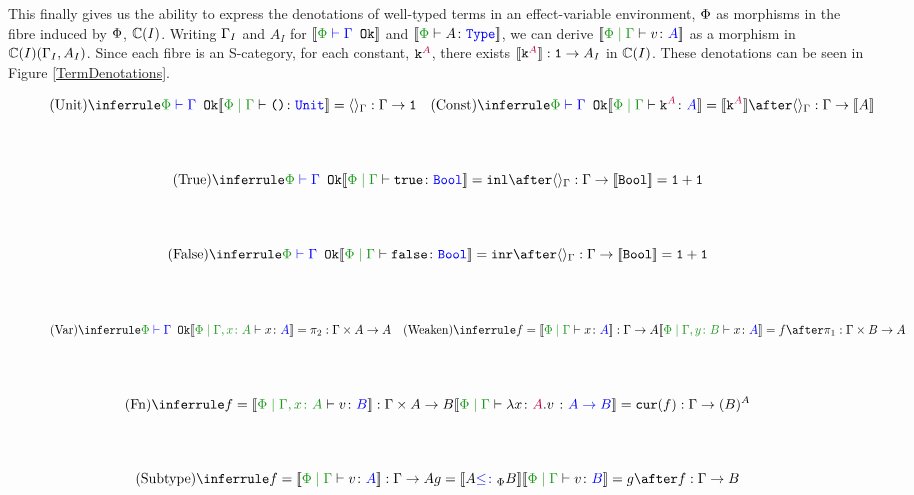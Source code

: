\documentclass{Report}
\begin{document}
This finally gives us the ability to express the denotations of well-typed terms in an effect-variable environment, $\P$ as morphisms in the fibre induced by $\P$, $\C(I)$.  Writing $\G_I$ and $A_I$ for $\deno{\wellformedok{\P}{\G}}$ and $\deno{\typerelation{\P}{A}{\type}}$, we can derive $\deno{\gpetyperelation{v}{A}}$ as a morphism in $\C(I)(\G_I, A_I)$. Since each fibre is an S-category, for each constant, $\const{A}$, there exists $\deno{\const{A}}: \1 \rightarrow A_I$ in $\C(I)$. These denotations can be seen in Figure \ref{TermDenotations}.

\begin{figure}[H]
    \footnotesize
    \begin{framed}
        \[
            \ntreeruleI{\vunit}{\wellformedok{\P}{\G}}{\deno{\etyperelation{\P}{\G}{\u}{\U}} = \term{\G} : \G \rightarrow \1}
            \quad
            \ntreeruleI{\vconst}{\wellformedok{\P}{\G}}{\deno{\etyperelation{\P}{\G}{\const{A}}{A}} = \deno{\const{A}} \after \term{\G} : \G \rightarrow \deno{A}}
        \]
        \\
        \\        
        \[
            \ntreeruleI{\vtrue}{\wellformedok{\P}{\G}}{\deno{\etyperelation{\P}{\G}{\t}{\B}} = \inl \after \term{\G} : \G \rightarrow \deno{\B} = \1+\1}
        \]
        \\
        \\
        \[
            \ntreeruleI{\vfalse}{\wellformedok{\P}{\G}}{\deno{\etyperelation{\P}{\G}{\f}{\B}} = \inr \after \term{\G} : \G \rightarrow \deno{\B} = \1+\1}
        \]
        \\
        \\        
        \[
            \ntreeruleI{\vvar}{\wellformedok{\P}{\G}}{\deno{\etyperelation{\P}{\gax}{x}{A}} = \pp: \G \times A \rightarrow A}
            \quad    
            \ntreeruleI{\vweaken}{f = \deno{\gpetyperelation{x}{A}}: \G \rightarrow A}{\deno{\etyperelation{\P}{\gby}{x}{A}} = f \after \p: \G \times B \rightarrow A}
        \]
        \\
        \\        
        \[
            \ntreeruleI{\vfun}{f = \deno{\etyperelation{\P}{\gax}{v}{B}} : \G \times A \rightarrow B}{\deno{\etyperelation{\P}{\G}{\lam{x}{A}{v}}{\ab}} = \cur{f} : \G \rightarrow (B)^A}
        \]
        \\
        \\        
        \[
            \ntreeruleII{\vsubtype}{f = \deno{\etyperelation{\P}{\G}{v}{A}} : \G \rightarrow A}{g = \deno{A \subtypep B}}{\deno{\etyperelation{\P}{\G}{v}{B}} = g \after f : \G \rightarrow B}
\]
\end{framed}
\end{figure}
\end{document}
